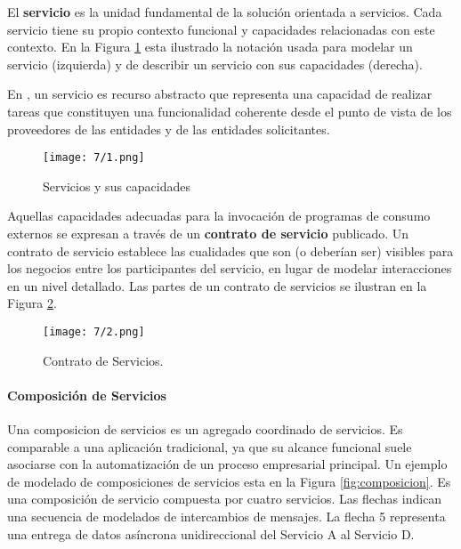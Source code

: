   El \textbf{\gls{servicio}} es la unidad fundamental de la solución orientada a servicios.  Cada servicio tiene su propio contexto funcional y capacidades relacionadas con este contexto.  En la Figura \ref{fig:servicio} esta ilustrado la notaci\'on usada para modelar un servicio (izquierda) y de describir un  servicio con sus capacidades (derecha).
  
  En  \cite{W3C2022}, un servicio es recurso abstracto que representa una capacidad de realizar tareas que constituyen una funcionalidad coherente desde el punto de vista de los proveedores de las entidades y de las entidades solicitantes.  

  
   			 
 	\begin{figure}%
 			\centering
 	\texttt{[image: 7/1.png]}
 	\caption{Servicios y sus capacidades}
 	\label{fig:servicio}
 \end{figure}
 
 Aquellas capacidades adecuadas para la invocación de programas de consumo externos se expresan a través de un \textbf{contrato de servicio} publicado. Un contrato de servicio establece las cualidades que son (o deberían ser) visibles para los negocios entre los participantes del servicio, en lugar de   modelar interacciones en un  nivel detallado. Las partes de un contrato de servicios se ilustran en la Figura \ref{fig:contrato}. 
 
 \begin{figure}%
 		\centering 	
 		\texttt{[image: 7/2.png]} 
 		\caption{Contrato de Servicios.}  
 		\label{fig:contrato}  
 \end{figure}
 
 \paragraph{Composición de Servicios}
 
  Una \gls{composicion de servicios} es un agregado coordinado de servicios. Es comparable a una aplicación tradicional, ya que su alcance funcional suele asociarse con la automatización de un proceso empresarial principal.  
  Un ejemplo de modelado de composiciones de servicios esta en la Figura \ref{fig:composicion}. Es una composición de servicio compuesta por cuatro servicios. Las flechas indican una secuencia de modelados de  intercambios de  mensajes. La flecha 5 representa una entrega de datos asíncrona unidireccional del Servicio A al Servicio D.
  

